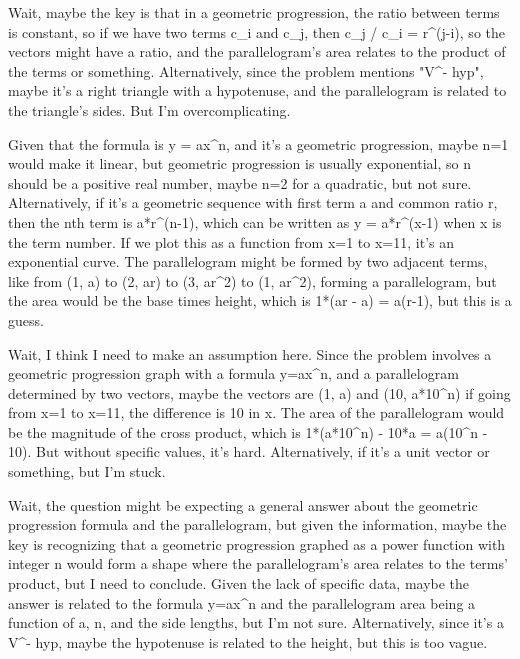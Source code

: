 Wait, maybe the key is that in a geometric progression, the ratio between terms is constant, so if we have two terms c_i and c_j, then c_j / c_i = r^(j-i), so the vectors might have a ratio, and the parallelogram's area relates to the product of the terms or something. Alternatively, since the problem mentions "V^- hyp", maybe it's a right triangle with a hypotenuse, and the parallelogram is related to the triangle's sides. But I'm overcomplicating. 

Given that the formula is y = ax^n, and it's a geometric progression, maybe n=1 would make it linear, but geometric progression is usually exponential, so n should be a positive real number, maybe n=2 for a quadratic, but not sure. Alternatively, if it's a geometric sequence with first term a and common ratio r, then the nth term is a*r^(n-1), which can be written as y = a*r^(x-1) when x is the term number. If we plot this as a function from x=1 to x=11, it's an exponential curve. The parallelogram might be formed by two adjacent terms, like from (1, a) to (2, ar) to (3, ar^2) to (1, ar^2), forming a parallelogram, but the area would be the base times height, which is 1*(ar - a) = a(r-1), but this is a guess. 

Wait, I think I need to make an assumption here. Since the problem involves a geometric progression graph with a formula y=ax^n, and a parallelogram determined by two vectors, maybe the vectors are (1, a) and (10, a*10^n) if going from x=1 to x=11, the difference is 10 in x. The area of the parallelogram would be the magnitude of the cross product, which is 1*(a*10^n) - 10*a = a(10^n - 10). But without specific values, it's hard. Alternatively, if it's a unit vector or something, but I'm stuck. 

Wait, the question might be expecting a general answer about the geometric progression formula and the parallelogram, but given the information, maybe the key is recognizing that a geometric progression graphed as a power function with integer n would form a shape where the parallelogram's area relates to the terms' product, but I need to conclude. Given the lack of specific data, maybe the answer is related to the formula y=ax^n and the parallelogram area being a function of a, n, and the side lengths, but I'm not sure. Alternatively, since it's a V^- hyp, maybe the hypotenuse is related to the height, but this is too vague. 


